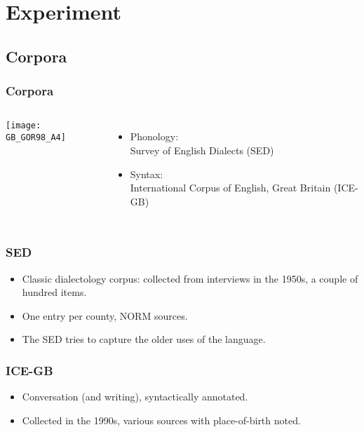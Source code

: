 \documentclass{beamer}
\begin{document}
\section{Experiment}
\subsection{Corpora}
\begin{frame}
  \frametitle{Corpora}
  \begin{columns}
  \texttt{[image: GB\_GOR98\_A4]}
  \begin{itemize}
  \item Phonology: \\ Survey of English Dialects (SED)
  \item Syntax: \\ International Corpus of English, Great Britain
    (ICE-GB)
  \end{itemize}
    \end{columns}
\end{frame}
\begin{frame}
  \frametitle{SED}
  \begin{itemize}
  \item Classic dialectology corpus: collected from interviews in the
    1950s, a couple of hundred items.
  \item One entry per county, NORM sources.
  \item The SED tries to capture the older uses of the language.
  \end{itemize}
\end{frame}
\begin{frame}
  \frametitle{ICE-GB}
  \begin{itemize}
  \item Conversation (and writing), syntactically annotated.
  \item Collected in the 1990s, various sources with place-of-birth noted.
  \end{itemize}
\end{frame}
\end{document}
